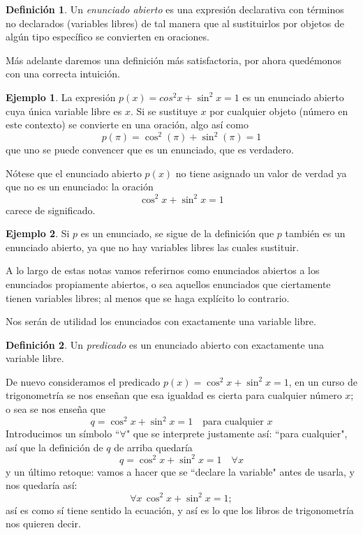 \documentclass{book}
\theoremstyle{definition}
\newtheorem{df}{Definición}[chapter]
\newtheorem*{ejm}{Ejemplo}
\begin{document}
\begin{df}
	Un \emph{enunciado abierto} es una expresión declarativa con términos no declarados (variables libres) de tal manera que al sustituirlos por objetos de algún tipo específico se convierten en oraciones.
\end{df}
Más adelante daremos una definición más satisfactoria, por ahora quedémonos con una correcta intuición.
\begin{ejm}
	La expresión $p(x) = cos^2 x + \sin^2 x = 1$ es un enunciado abierto cuya única variable libre es $x$.
	Si se sustituye $x$ por cualquier objeto (número en este contexto) se convierte en una oración, algo así como \[p(\pi) = \cos^2(\pi) + \sin^2(\pi) = 1\]
	que uno se puede convencer que es un enunciado, que es verdadero.
	
	Nótese que el enunciado abierto $p(x)$ no tiene asignado un valor de verdad ya que no es un enunciado: la oración \[\cos^2 x + \sin^2 x = 1\]
	carece de significado.
\end{ejm}
\begin{ejm}
	Si $p$ es un enunciado, se sigue de la definición que $p$ también es un enunciado abierto, ya que no hay variables libres las cuales sustituir.
	
	A lo largo de estas notas vamos referirnos como enunciados abiertos a los enunciados propiamente abiertos, o sea aquellos enunciados que ciertamente tienen variables libres; al menos que se haga explícito lo contrario.
\end{ejm}
Nos serán de utilidad los enunciados con exactamente una variable libre.
\begin{df}
	Un \emph{predicado} es un enunciado abierto con exactamente una variable libre. 
\end{df}
De nuevo consideramos el predicado $p(x) = \cos^2 x + \sin^2 x = 1$, en un curso de trigonometría se nos enseñan que esa igualdad es cierta para cualquier número $x$; o sea se nos enseña que
\[q = \cos^2 x + \sin^2 x = 1\quad \text{para cualquier } x \]
Introducimos un símbolo ``$\forall$" que se interprete justamente así: ``para cualquier", así que la definición de $q$ de arriba quedaría
\[q = \cos^2 x + \sin^2 x = 1\quad \forall x\]
y un último retoque: vamos a hacer que se ``declare la variable" antes de usarla, y nos quedaría así:
\begin{equation}
	\forall x\, \cos^2 x + \sin^2 x = 1;
\end{equation}
así es como sí tiene sentido la ecuación, y así es lo que los libros de trigonometría nos quieren decir.
\end{document}
